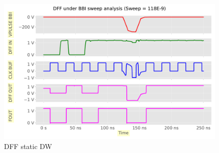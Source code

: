 
\begin{figure}[h]
	\centering
	\includegraphics[width=\columnwidth]{./figures/dff-pdf-dw-neg/anim0108.pdf}
	\caption{DFF static DW}
	\label{dffstatic-dw}
\end{figure}
